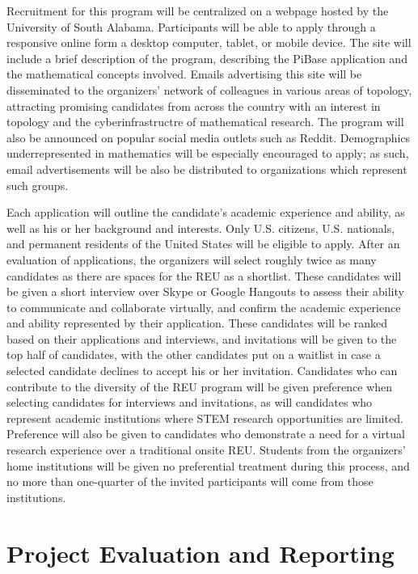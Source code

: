   Recruitment for this program will be centralized on a webpage hosted
  by the University of South Alabama. Participants will be able to apply
  through a responsive online form a desktop computer, tablet, or mobile device.
  The site will include a brief description of the program, describing the
  PiBase application and the mathematical concepts involved.
  Emails advertising this site will be disseminated to the organizers'
  network of colleagues in various areas of
  topology, attracting promising candidates from across
  the country with an interest in topology and the cyberinfrastructre of
  mathematical research. The program will also be announced on popular social
  media outlets such as Reddit. Demographics underrepresented in mathematics
  will be especially encouraged to apply; as such, email advertisements
  will be also be distributed to organizations which represent such groups.

  Each application will outline the candidate's academic
  experience and ability, as well as his or her background and interests.
  Only U.S. citizens, U.S. nationals, and
  permanent residents of the United States will be eligible to apply.
  After an evaluation of applications, the organizers will select roughly twice
  as many candidates as there are spaces for the REU as a shortlist. These
  candidates will be given a short interview over Skype or Google Hangouts
  to assess their ability to communicate and collaborate virtually,
  and confirm the academic experience
  and ability represented by their application. These candidates will be
  ranked based on their applications and interviews, and invitations will
  be given to the top half of candidates, with the other candidates put
  on a waitlist in case a selected candidate declines to accept his or her
  invitation. Candidates who can contribute to the diversity of the
  REU program will be given preference when selecting candidates for
  interviews and invitations, as will candidates who represent academic
  institutions where STEM research opportunities are limited. Preference
  will also be given to candidates who demonstrate a need for a virtual
  research experience over a traditional onsite REU.
  Students from the organizers' home institutions
  will be given no preferential treatment during this process, and no more
  than one-quarter of the invited participants will come from those
  institutions.

\section{Project Evaluation and Reporting}

